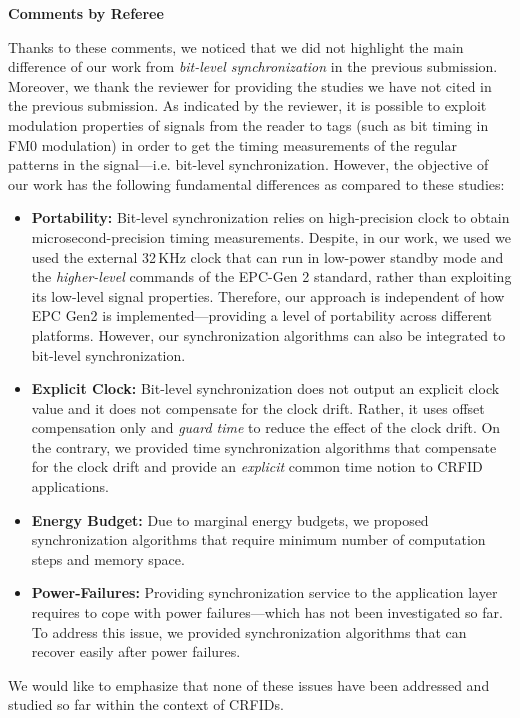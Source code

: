 \documentclass[10pt]{article}
\newcommand{\response}[1]{{\color{blue} #1}}
\newcounter{refereeCounter}
\newenvironment{responses}{%
\refstepcounter{refereeCounter}%
\textbf{\large Comments by Referee \therefereeCounter}
\begin{enumerate}%
\renewcommand{\labelenumi}{\textbf{[R\therefereeCounter :\,\arabic{enumi}]}} %
}{\end{enumerate}}
\begin{document}
\begin{responses}
\response{
Thanks to these comments, we noticed that we did not highlight the main difference of our work from \emph{bit-level synchronization} in the previous submission. Moreover, we thank the reviewer for providing the studies we have not cited in the previous submission.\newline
As indicated by the reviewer, it is possible to exploit modulation properties of signals from the reader to tags (such as bit timing in FM0 modulation) in order to get the timing measurements of the regular patterns in the signal---i.e. bit-level synchronization. However, the objective of our work has the following fundamental differences as compared to these studies:
\begin{itemize}
	\item \textbf{Portability:} Bit-level synchronization relies on high-precision clock to obtain microsecond-precision timing measurements. Despite, in our work, we used we used the external 32\,KHz clock that can run in low-power standby mode and the \emph{higher-level} commands of the EPC-Gen 2 standard, rather than exploiting its low-level signal properties. Therefore, our approach is independent of how EPC Gen2 is implemented---providing a level of portability across different platforms. However, our synchronization algorithms can also be integrated to bit-level synchronization.
	\item \textbf{Explicit Clock:} Bit-level synchronization does not output an explicit clock value and it does not compensate for the clock drift. Rather, it uses offset compensation only and \emph{guard time} to reduce the effect of the clock drift. On the contrary, we provided time synchronization algorithms that compensate for the clock drift and provide an \emph{explicit} common time notion to CRFID applications.
	\item \textbf{Energy Budget:} Due to marginal energy budgets, we proposed synchronization algorithms that require minimum number of computation steps and memory space.
	\item \textbf{Power-Failures:} Providing synchronization service to the application layer requires to cope with power failures---which has not been investigated so far. To address this issue, we provided synchronization algorithms that can recover easily after power failures.
\end{itemize}

We would like to emphasize that none of these issues have been addressed and studied so far within the context of CRFIDs.
}


\end{responses}
\end{document}
